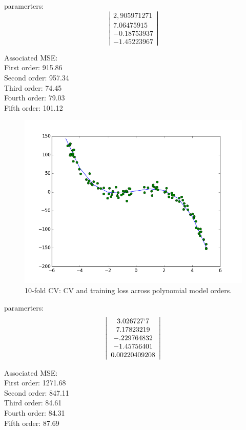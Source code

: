 \documentclass[10pt]{article}
\begin{document}
\begin{itemize}
paramerters:
\[ \left|  \begin{array}{c}
2,905971271\\
7.06475915\\
-0.18753937\\
-1.45223967 \end{array} \right| \]

Associated MSE:\\
First order:  915.86\\
Second order:  957.34\\
Third order:  74.45\\
Fourth order:  79.03\\
Fifth order: 101.12

\begin{figure}[htb]
\begin{center}
\includegraphics[width=12cm]{k_fold_4order.png}
\caption{10-fold CV: CV and training loss across polynomial model orders.
\label{fig:tenfold}}
\end{center}
\end{figure}

paramerters:
\[ \left|  \begin{array}{c}
3.026727`7\\
7.17823219\\
-.229764832\\
-1.45756401\\
0.00220409208 \end{array} \right| \]


Associated MSE:\\
First order:  1271.68\\
Second order:  847.11\\
Third order:  84.61\\
Fourth order:  84.31\\
Fifth order: 87.69


\end{itemize}
\end{document}
